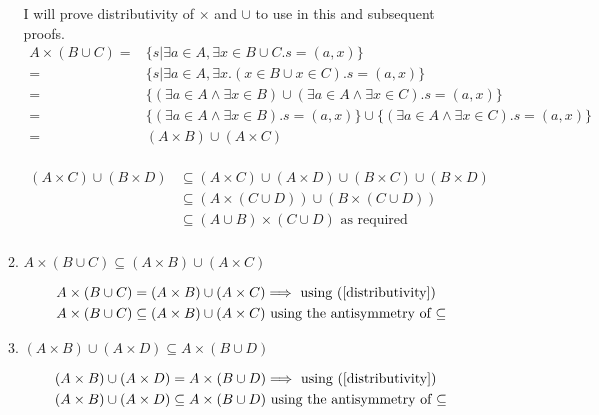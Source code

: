 \documentclass[10pt,\jkfside,a4paper]{article}
\begin{document}
\begin{enumerate}
\begin{enumerate}
I will prove distributivity of $\times$ and $\cup$ to use in this and subsequent proofs.
\begin{equation}\label{distributivity}
\begin{split}
A \times (B \cup C) =& \{s| \exists a \in A, \exists x \in B \cup C. s = (a, x)\}\\
=& \{s| \exists a \in A, \exists x. (x \in B \cup x \in C). s = (a, x)\}\\
=& \{(\exists a \in A \wedge \exists x \in B) \cup (\exists a \in A \wedge \exists x \in C). s = (a, x)\}\\
=& \{(\exists a \in A \wedge \exists x \in B). s = (a, x)\} \cup \{(\exists a \in A \wedge \exists x \in C). s = (a, x)\}\\
=& (A \times B) \cup (A \times C)\\
\end{split}
\end{equation}

\begin{equation}
\begin{split}
(A \times C) \cup (B \times D) &\subseteq (A \times C) \cup (A \times D) \cup (B \times C) \cup (B \times D)\\
							   &\subseteq (A \times (C \cup D)) \cup (B \times (C \cup D))\\
							   &\subseteq (A \cup B) \times (C \cup D)\text{ as required}\\
\end{split}
\end{equation}

\item $A \times (B \cup C) \subseteq (A \times B) \cup (A \times C)$

\begin{equation}
\begin{split}
A \times (B \cup C) &= (A \times B) \cup (A \times C) \Longrightarrow \text{ using (\ref{distributivity})} \\ 
A \times (B \cup C) &\subseteq (A \times B) \cup (A \times C) \text{ using the antisymmetry of $\subseteq$}\\
\end{split}
\end{equation}

\item $(A \times B) \cup (A \times D) \subseteq A \times (B \cup D)$

\begin{equation}
\begin{split}
(A \times B) \cup (A \times D) &= A \times (B \cup D) \Longrightarrow \text{ using (\ref{distributivity})} \\ 
(A \times B) \cup (A \times D) &\subseteq A \times (B \cup D) \text{ using the antisymmetry of $\subseteq$}\\
\end{split}
\end{equation}


\end{enumerate}
\end{enumerate}
\end{document}
